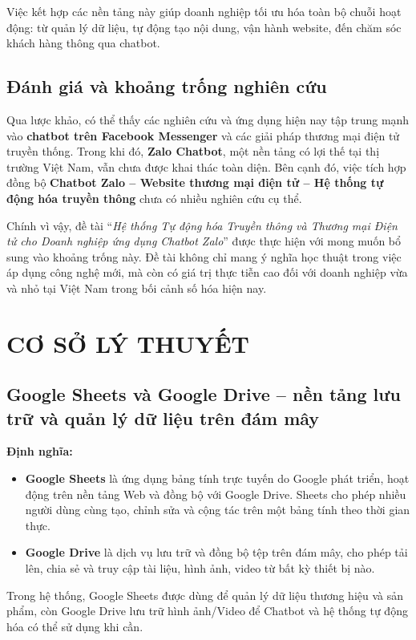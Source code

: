Việc kết hợp các nền tảng này giúp doanh nghiệp tối ưu hóa toàn bộ chuỗi hoạt động: từ quản lý dữ liệu, tự động tạo nội dung, vận hành website, đến chăm sóc khách hàng thông qua chatbot.  

\subsection{Đánh giá và khoảng trống nghiên cứu}
Qua lược khảo, có thể thấy các nghiên cứu và ứng dụng hiện nay tập trung mạnh vào \textbf{chatbot trên Facebook Messenger} và các giải pháp thương mại điện tử truyền thống. Trong khi đó, \textbf{Zalo Chatbot}, một nền tảng có lợi thế tại thị trường Việt Nam, vẫn chưa được khai thác toàn diện. Bên cạnh đó, việc tích hợp đồng bộ \textbf{Chatbot Zalo – Website thương mại điện tử – Hệ thống tự động hóa truyền thông} chưa có nhiều nghiên cứu cụ thể.  

Chính vì vậy, đề tài ``\textit{Hệ thống Tự động hóa Truyền thông và Thương mại Điện tử cho Doanh nghiệp ứng dụng Chatbot Zalo}'' được thực hiện với mong muốn bổ sung vào khoảng trống này. Đề tài không chỉ mang ý nghĩa học thuật trong việc áp dụng công nghệ mới, mà còn có giá trị thực tiễn cao đối với doanh nghiệp vừa và nhỏ tại Việt Nam trong bối cảnh số hóa hiện nay.  

\section{CƠ SỞ LÝ THUYẾT}

\subsection{Google Sheets và Google Drive – nền tảng lưu trữ và quản lý dữ liệu trên đám mây}

\textbf{Định nghĩa:}
\begin{itemize}
    \item \textbf{Google Sheets} là ứng dụng bảng tính trực tuyến do Google phát triển, hoạt động trên nền tảng Web và đồng bộ với Google Drive. Sheets cho phép nhiều người dùng cùng tạo, chỉnh sửa và cộng tác trên một bảng tính theo thời gian thực.
    \item \textbf{Google Drive} là dịch vụ lưu trữ và đồng bộ tệp trên đám mây, cho phép tải lên, chia sẻ và truy cập tài liệu, hình ảnh, video từ bất kỳ thiết bị nào.
\end{itemize}

Trong hệ thống, Google Sheets được dùng để quản lý dữ liệu thương hiệu và sản phẩm, còn Google Drive lưu trữ hình ảnh/Video để Chatbot và hệ thống tự động hóa có thể sử dụng khi cần.

